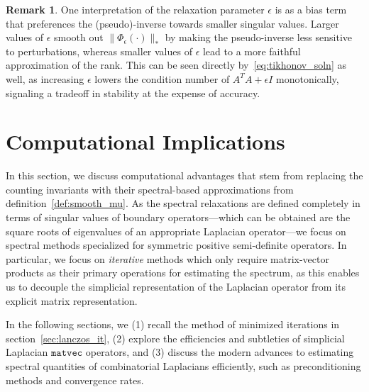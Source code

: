 \documentclass[10pt]{article}
\numberwithin{equation}{section}
\newcommand{\+}{%
	\raisebox{0.18ex}{\scaleobj{0.55}{+}}
}
\theoremstyle{definition}
\newtheorem{remark}{Remark}
\theoremstyle{definition}
\begin{document}
 \begin{remark}
 One interpretation of the relaxation parameter $\epsilon$ is as a bias term that preferences the (pseudo)-inverse towards smaller singular values.
Larger values of $\epsilon$ smooth out $\lVert \Phi_\epsilon(\cdot) \rVert_\ast$ by making the pseudo-inverse less sensitive to perturbations, whereas smaller values of $\epsilon$ lead to a more faithful approximation of the rank.
This can be seen directly by~\eqref{eq:tikhonov_soln} as well, as increasing $\epsilon$  lowers the condition number of $A^T A + \epsilon I$ monotonically, signaling a tradeoff in stability at the expense of accuracy. 
 \end{remark}
 
\section{Computational Implications}\label{sec:computational_imp}
In this section, we discuss computational advantages that stem from replacing the counting invariants with their spectral-based approximations from definition~\ref{def:smooth_mu}.
As the spectral relaxations are defined completely in terms of singular values of boundary operators---which can be obtained are the square roots of eigenvalues of an appropriate Laplacian operator---we focus on spectral methods specialized for symmetric positive semi-definite operators.
In particular, we focus on \emph{iterative} methods which only require matrix-vector products as their primary operations for estimating the spectrum, as this enables us to decouple the simplicial representation of the  Laplacian operator from its explicit matrix representation.

In the following sections, we (1) recall the method of minimized iterations in section~\ref{sec:lanczos_it}, (2) explore the efficiencies and subtleties of simplicial Laplacian $\mathtt{matvec}$ operators, and (3) discuss the modern advances to estimating spectral quantities of combinatorial Laplacians efficiently, such as preconditioning methods and convergence rates. 


\end{document}
